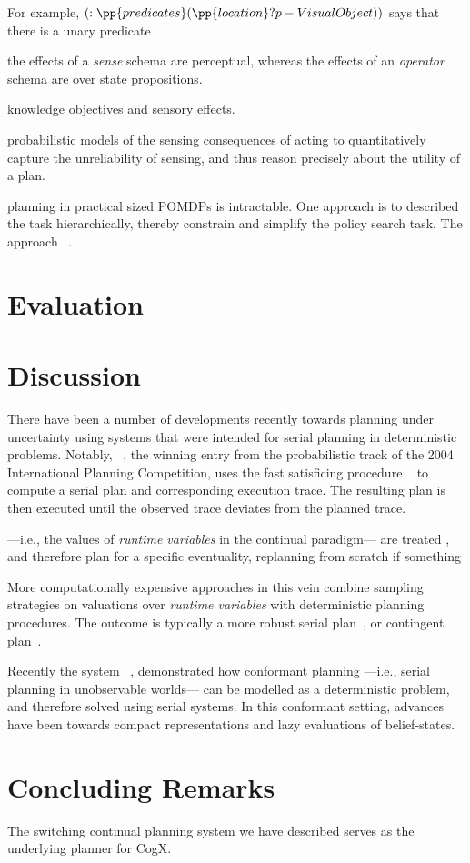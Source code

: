 \documentclass[letterpaper]{article}
\begin{document}
For example, $(:\pp{predicates} (\pp{location} ?p - VisualObject))$
says that there is a unary predicate 



the effects of a {\em sense} schema are perceptual, whereas the
effects of an {\em operator} schema are over state propositions.


knowledge objectives and  sensory effects. 


probabilistic models of the sensing consequences of acting to
quantitatively capture the unreliability of sensing, and thus reason
precisely about the utility of a plan. 


planning in practical sized POMDPs is intractable. One approach is to
described the task hierarchically, thereby constrain and simplify the
policy search task. The approach ~\cite{}. 






\section{Evaluation}


\section{Discussion}

There have been a number of developments recently towards planning
under uncertainty using systems that were intended for serial planning
in deterministic problems.  Notably,
~\cite{yoon:etal:2007}, the winning entry from the
probabilistic track of the 2004 International Planning Competition,
uses the fast satisficing procedure
~\cite{hoffmann:nebel:2001} to compute a serial plan and
corresponding execution trace. The resulting plan is then executed
until the observed trace deviates from the planned trace.

 ---i.e., the values of {\em
runtime variables} in the continual paradigm--- are treated , and
therefore plan for a specific eventuality, replanning from scratch if
something


More computationally expensive approaches in this vein combine
sampling strategies on valuations over {\em runtime variables} with
deterministic planning procedures. The outcome is typically a more
robust serial plan~\cite{yoon:etal:2008}, or contingent
plan~\cite{majercik:2006}.



Recently the system
~\cite{hoffmann:brafman:2006}, demonstrated how
conformant planning ---i.e., serial planning in unobservable worlds---
can be modelled as a deterministic problem, and therefore solved using
serial systems. In this conformant setting, advances have been towards
compact representations and lazy evaluations of belief-states.
 

\section{Concluding Remarks}

The switching continual planning system we have described serves as
the underlying planner for CogX. 




\end{document}
